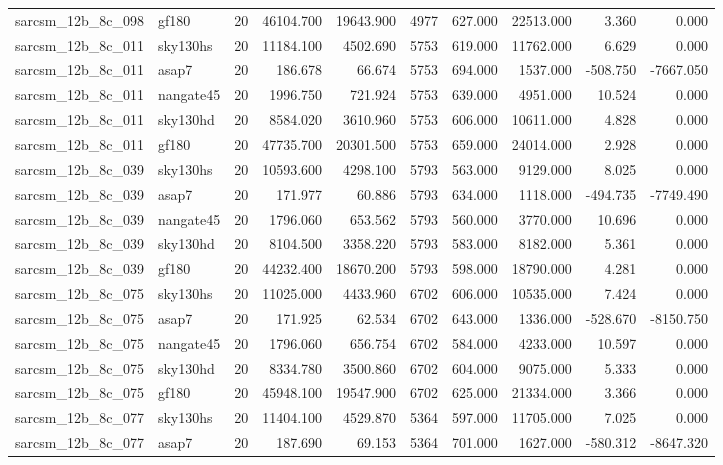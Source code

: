 \begin{longtable}{llrrrrrrrr}
sarcsm\_12b\_8c\_098 & gf180 & 20 & 46104.700 & 19643.900 & 4977 & 627.000 & 22513.000 & 3.360 & 0.000 \\
sarcsm\_12b\_8c\_011 & sky130hs & 20 & 11184.100 & 4502.690 & 5753 & 619.000 & 11762.000 & 6.629 & 0.000 \\
sarcsm\_12b\_8c\_011 & asap7 & 20 & 186.678 & 66.674 & 5753 & 694.000 & 1537.000 & -508.750 & -7667.050 \\
sarcsm\_12b\_8c\_011 & nangate45 & 20 & 1996.750 & 721.924 & 5753 & 639.000 & 4951.000 & 10.524 & 0.000 \\
sarcsm\_12b\_8c\_011 & sky130hd & 20 & 8584.020 & 3610.960 & 5753 & 606.000 & 10611.000 & 4.828 & 0.000 \\
sarcsm\_12b\_8c\_011 & gf180 & 20 & 47735.700 & 20301.500 & 5753 & 659.000 & 24014.000 & 2.928 & 0.000 \\
sarcsm\_12b\_8c\_039 & sky130hs & 20 & 10593.600 & 4298.100 & 5793 & 563.000 & 9129.000 & 8.025 & 0.000 \\
sarcsm\_12b\_8c\_039 & asap7 & 20 & 171.977 & 60.886 & 5793 & 634.000 & 1118.000 & -494.735 & -7749.490 \\
sarcsm\_12b\_8c\_039 & nangate45 & 20 & 1796.060 & 653.562 & 5793 & 560.000 & 3770.000 & 10.696 & 0.000 \\
sarcsm\_12b\_8c\_039 & sky130hd & 20 & 8104.500 & 3358.220 & 5793 & 583.000 & 8182.000 & 5.361 & 0.000 \\
sarcsm\_12b\_8c\_039 & gf180 & 20 & 44232.400 & 18670.200 & 5793 & 598.000 & 18790.000 & 4.281 & 0.000 \\
sarcsm\_12b\_8c\_075 & sky130hs & 20 & 11025.000 & 4433.960 & 6702 & 606.000 & 10535.000 & 7.424 & 0.000 \\
sarcsm\_12b\_8c\_075 & asap7 & 20 & 171.925 & 62.534 & 6702 & 643.000 & 1336.000 & -528.670 & -8150.750 \\
sarcsm\_12b\_8c\_075 & nangate45 & 20 & 1796.060 & 656.754 & 6702 & 584.000 & 4233.000 & 10.597 & 0.000 \\
sarcsm\_12b\_8c\_075 & sky130hd & 20 & 8334.780 & 3500.860 & 6702 & 604.000 & 9075.000 & 5.333 & 0.000 \\
sarcsm\_12b\_8c\_075 & gf180 & 20 & 45948.100 & 19547.900 & 6702 & 625.000 & 21334.000 & 3.366 & 0.000 \\
sarcsm\_12b\_8c\_077 & sky130hs & 20 & 11404.100 & 4529.870 & 5364 & 597.000 & 11705.000 & 7.025 & 0.000 \\
sarcsm\_12b\_8c\_077 & asap7 & 20 & 187.690 & 69.153 & 5364 & 701.000 & 1627.000 & -580.312 & -8647.320 \\

\end{longtable}
